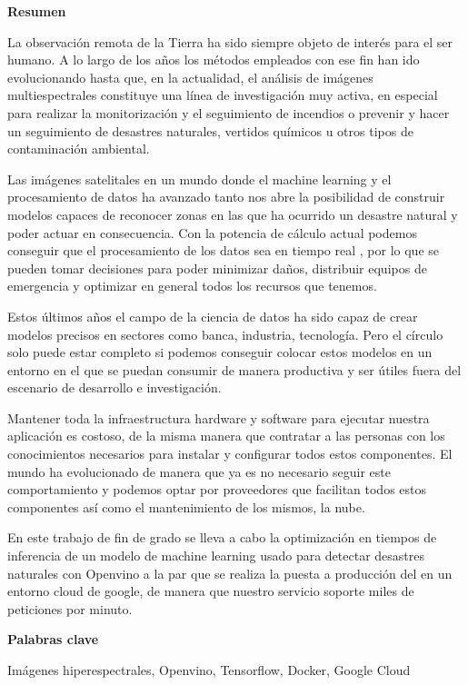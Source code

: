 \cleardoublepage
\begin{center}

{\bf \Huge Resumen}

\end{center}

La observación remota de la Tierra ha sido siempre objeto de interés para el ser humano.
A lo largo de los años los métodos empleados con ese fin han ido evolucionando hasta que, en la actualidad, el análisis de imágenes multiespectrales constituye una línea de
investigación muy activa, en especial para realizar la monitorización y el seguimiento de incendios o prevenir y hacer un seguimiento de desastres naturales, vertidos químicos
u otros tipos de contaminación ambiental.

Las imágenes satelitales en un mundo donde el machine learning y el procesamiento de datos ha avanzado tanto nos abre la posibilidad de construir modelos capaces de reconocer zonas
en las que ha ocurrido un desastre natural y poder actuar en consecuencia.
Con la potencia de cálculo actual podemos conseguir que el procesamiento de los datos sea en tiempo real , por lo que se pueden tomar decisiones para poder minimizar daños, distribuir
equipos de emergencia y optimizar en general todos los recursos que tenemos.

Estos últimos años el campo de la ciencia de datos ha sido capaz de crear modelos precisos en sectores como banca, industria, tecnología.
Pero el círculo solo puede estar completo si podemos
conseguir colocar estos modelos en un entorno en el que se puedan consumir de manera productiva y ser útiles fuera del escenario de desarrollo e investigación.

Mantener toda la infraestructura hardware y software para ejecutar nuestra aplicación es costoso, de la misma manera que contratar a las personas con los conocimientos necesarios
para instalar y configurar todos estos componentes.
El mundo ha evolucionado de manera que ya es no necesario seguir este comportamiento y podemos optar por proveedores que facilitan todos estos componentes
así como el mantenimiento de los mismos, la nube.

En este trabajo de fin de grado se lleva a cabo la optimización en tiempos de inferencia de un modelo de machine learning usado para detectar desastres naturales con Openvino a la par que se realiza la puesta a
producción del en un entorno cloud de google, de manera que nuestro servicio soporte miles de peticiones por minuto.

\vspace{0.8cm}
\begin{center}


{\bf \Large Palabras clave}

\end{center}

Imágenes hiperespectrales, Openvino, Tensorflow, Docker, Google Cloud

\vspace{0.3cm}